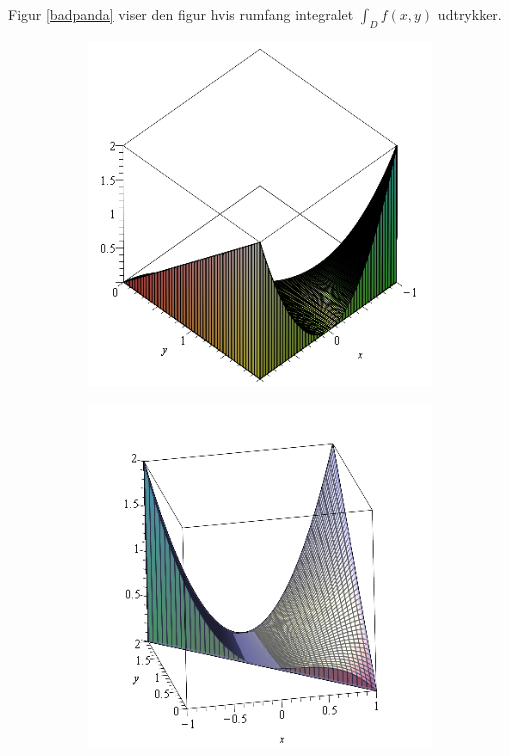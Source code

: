 \documentclass[11pt, fleqn]{article}
\begin{document}
Figur \ref{badpanda} viser den figur hvis rumfang integralet $\int_D f(x,y)$ udtrykker. 
\begin{figure}[H]
\caption{Den figur hvis rumfang integralet udtrykker}
\label{badpanda}
\begin{subfigure}{.5\textwidth}
	\centering
	\includegraphics[scale=0.5]{grumpyskydiver}
\end{subfigure}
\begin{subfigure}{.5\textwidth}
	\centering
	\includegraphics[scale=0.5]{sourmammal}
\end{subfigure}
\end{figure}
\end{document}
